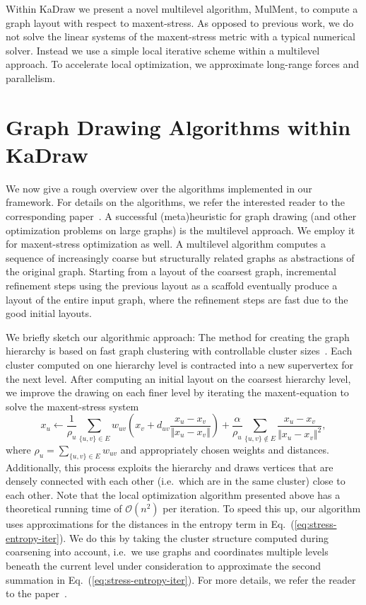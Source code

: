 \documentclass[11pt]{article}
\newcommand{\ie}{i.e.\ }
\begin{document}
Within KaDraw we present a novel multilevel algorithm, MulMent, to compute a graph layout with respect to maxent-stress.
%
As opposed to previous work, we do not solve the linear systems of the maxent-stress metric with a typical 
numerical solver. Instead we use a simple local iterative scheme within a multilevel approach.
To accelerate local optimization, we approximate long-range forces and parallelism.

\section{Graph Drawing Algorithms within KaDraw}
We now give a rough overview over the algorithms implemented in our framework. For details on the algorithms, we refer the interested reader to the corresponding paper~\cite{mulment}. 
A successful (meta)heuristic for graph drawing (and other optimization problems on large graphs) is the multilevel approach. We employ it for maxent-stress optimization as well.
A multilevel algorithm computes a sequence of increasingly coarse but structurally related graphs as abstractions of the original graph.
Starting from a layout of the coarsest graph, incremental refinement steps using the previous layout as a scaffold eventually produce a layout of the entire input graph, where the refinement steps are fast due to the good initial layouts. 

We briefly sketch our algorithmic 
approach: The method for creating the graph hierarchy is based on fast graph clustering with 
controllable cluster sizes~\cite{pcomplexnetworksviacluster}. 
Each cluster computed on one hierarchy level is contracted into a new supervertex for the next level.
After computing an initial layout on the coarsest hierarchy level, we improve the drawing 
on each finer level by iterating the maxent-equation to solve the maxent-stress system 
\begin{equation}
	x_{u} \gets \frac{1}{\rho_{u}} \sum_{\{u,v\}\in E} w_{uv} \left(x_{v} + d_{uv} \frac{x_{u}-x_{v}}{\Vert x_{u}-x_{v}\Vert}\right) + \frac{\alpha}{\rho_{u}} \sum_{\{u,v\}\notin E} \frac{x_{u}-x_{v}}{\Vert x_{u}-x_{v}\Vert^{2}},
\label{eq:stress-entropy-iter}
\end{equation}
where $\rho_{u}=\sum_{\{u,v\}\in E}w_{uv}$ and appropriately chosen weights and distances. 
Additionally, this process exploits
the hierarchy and draws vertices that are densely connected with each other (\ie which are in the same cluster) close to each other.
Note that the local optimization algorithm presented above has a theoretical running time of $\mathcal{O}(n^2)$ per iteration.
To speed this up, our algorithm uses approximations for the distances in the entropy term in Eq.~(\ref{eq:stress-entropy-iter}).
We do this by taking the cluster structure computed during coarsening into account, \ie we use graphs and coordinates multiple levels beneath the current level under consideration to approximate the second summation in Eq.~(\ref{eq:stress-entropy-iter}). For more details, we refer the reader to the paper~\cite{mulment}.
\end{document}
